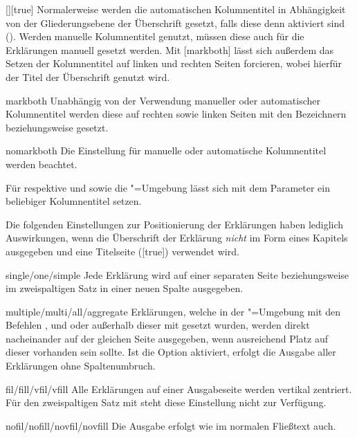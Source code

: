 \begin{Declaration}{[\PSet]}[true]
%
Normalerweise werden die automatischen Kolumnentitel in Abhängigkeit von der 
Gliederungsebene der Überschrift gesetzt, falls diese denn aktiviert sind 
(). Werden manuelle Kolumnentitel genutzt, müssen diese auch 
für die Erklärungen manuell gesetzt werden. Mit [markboth] 
lässt sich außerdem das Setzen der Kolumnentitel auf linken und rechten Seiten 
forcieren, wobei hierfür der Titel der Überschrift genutzt wird.
%
\begin{values}
\item[markboth]
  Unabhängig von der Verwendung manueller oder automatischer Kolumnentitel 
  werden diese auf rechten sowie linken Seiten mit den Bezeichnern 
   beziehungsweise  gesetzt.
\item[nomarkboth]
  Die Einstellung für manuelle oder automatische Kolumnentitel werden beachtet.
\end{values}
%
Für  respektive  und  
sowie die "=Umgebung lässt sich mit dem Parameter 
 ein beliebiger Kolumnentitel setzen. 

Die folgenden Einstellungen zur Positionierung der Erklärungen haben lediglich 
Auswirkungen, wenn die Überschrift der Erklärung \emph{nicht} im Form eines 
Kapitels ausgegeben und eine Titelseite ([true]) verwendet 
wird.
%
\begin{values}
\item[single/one/simple]
  Jede Erklärung wird auf einer separaten Seite
  beziehungsweise im zweispaltigen Satz in einer neuen Spalte ausgegeben.
\item[multiple/multi/all/aggregate]
  Erklärungen, welche in der "=Umgebung mit den 
  Befehlen ,  und  oder 
  außerhalb dieser mit  gesetzt wurden, werden direkt 
  nacheinander auf der gleichen Seite ausgegeben, wenn ausreichend Platz auf 
  dieser vorhanden sein sollte. Ist die Option  aktiviert, 
  erfolgt die Ausgabe aller Erklärungen ohne Spaltenumbruch.
\item[fil/fill/vfil/vfill]
  Alle Erklärungen auf einer Ausgabeseite werden vertikal zentriert. Für 
  den zweispaltigen Satz mit  steht diese Einstellung nicht 
  zur Verfügung.
\item[nofil/nofill/novfil/novfill]
  Die Ausgabe erfolgt wie im normalen Fließtext auch.
\end{values}
\end{Declaration}

